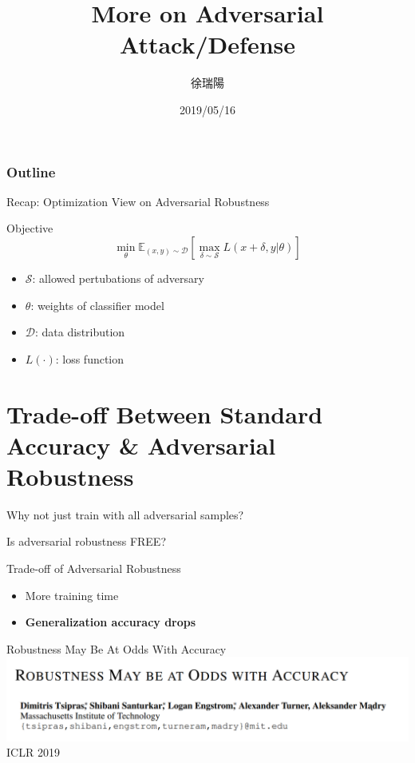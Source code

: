 \documentclass{beamer}
\title{More on Adversarial Attack/Defense}
\author{徐瑞陽}
\date{2019/05/16}
\begin{document}
\begin{frame}
\maketitle
\end{frame}

\begin{frame}
\frametitle{Outline}
\tableofcontents
\end{frame}

\begin{frame}{Recap: Optimization View on Adversarial Robustness}
  \begin{block}{Objective}
    \[ \min_\theta \mathbb{E}_{(x,y) \sim \mathcal{D}}[\max_{\delta \sim \mathcal{S}}L(x+\delta,y|\theta)]\]
  \end{block}
  \begin{itemize}
    \item $\mathcal{S}$: allowed pertubations of adversary
    \item $\theta$: weights of classifier model
    \item $\mathcal{D}$: data distribution
    \item $L(\cdot)$: loss function
  \end{itemize}
\end{frame}

\section{Trade-off Between Standard Accuracy \& Adversarial Robustness}

\begin{frame}
    \center \LARGE{Why not just train with all adversarial samples?}
\end{frame}

\begin{frame}
    \center \LARGE{Is adversarial robustness FREE?}
\end{frame}

\begin{frame}{Trade-off of Adversarial Robustness}
  \begin{itemize}
    \item More training time
    \item \textbf{Generalization accuracy drops} 
  \end{itemize}
\end{frame}

\begin{frame}{Robustness May Be At Odds With Accuracy}
  \includegraphics[width=\textwidth]{fig/p2/title.png}
  \center ICLR 2019
\end{frame}
\end{document}
